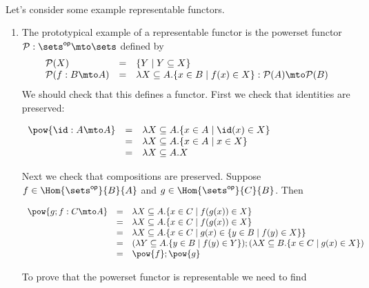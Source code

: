\ \\
\noindent
Let's consider some example representable functors.
\begin{enumerate}
\item The prototypical example of a representable functor is the
  powerset functor $\mathcal{P} : \sets^{\mathsf{op}} \mto \sets$
  defined by
  \[
  \begin{array}{lll}
    \mathcal{P}(X) & = & \{Y \mid Y \subseteq X\}\\
    \mathcal{P}(f : B \mto A) & = & \lambda X \subseteq A.\{x \in B \mid f(x) \in X\} : \mathcal{P}(A) \mto \mathcal{P}(B)\\
  \end{array}
  \]
  We should check that this defines a functor.  First we check that identities are preserved:
  \begin{center}
    \begin{math}
      \begin{array}{lll}
        \pow{\id : A \mto A}
        & = & \lambda X \subseteq A.\{x \in A \mid \id(x) \in X\}\\
        & = & \lambda X \subseteq A.\{x \in A \mid x \in X\}\\
        & = & \lambda X \subseteq A.X\\
      \end{array}
    \end{math}
  \end{center}
  Next we check that compositions are preserved.  Suppose $f \in
  \Hom{\sets^{\mathsf{op}}}{B}{A}$ and $g \in \Hom{\sets^{\mathsf{op}}}{C}{B}$.  Then
  \begin{center}
    \begin{math}
      \begin{array}{lll}
        \pow{g;f : C \mto A}
        & = & \lambda X \subseteq A.\{x \in C \mid f(g(x)) \in X\}\\
        & = & \lambda X \subseteq A.\{x \in C \mid f(g(x)) \in X\}\\
        & = & \lambda X \subseteq A.\{x \in C \mid g(x) \in \{y \in B \mid f(y) \in X\}\}\\
        & = & (\lambda Y \subseteq A.\{y \in B \mid f(y) \in Y\});(\lambda X \subseteq B.\{x \in C \mid g(x) \in X\})\\
        & = & \pow{f};\pow{g}
      \end{array}
    \end{math}
  \end{center}
  To prove that the powerset functor is representable we need to find

\end{enumerate}
